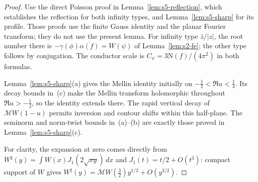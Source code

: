 \documentclass[11pt]{article}
\numberwithin{equation}{section}
\newcommand{\N}{\mathrm N}
\begin{document}
\begin{proof}
Use the direct Poisson proof in Lemma~\ref{lem:s5-reflection}, which establishes
the reflection for both infinity types, and Lemma~\ref{lem:s5-sharp} for its profile.
Those proofs use the finite Gauss identity and the planar Fourier transform;
they do not use the present lemma. For infinity type $\bar z/|z|$, the root number
there is $-\gamma(\phi)\overline{\alpha(f)}=W(\psi)$ of Lemma~\ref{lem:s2-fe};
the other type follows by conjugation. The conductor scale is
$C_\psi=3\N(f)/(4\pi^2)$ in both formulas.

Lemma~\ref{lem:s5-sharp}(a) gives the Mellin identity initially on
$-\frac12<\Re u<\frac14$. Its decay bounds in~(c) make the Mellin transform
holomorphic throughout $\Re u>-\frac12$, so the identity extends there.
The rapid vertical decay of $\mathcal MW(1-u)$ permits inversion and contour
shifts within this half-plane. The seminorm and norm-twist bounds in~(a)--(b)
are exactly those proved in Lemma~\ref{lem:s5-sharp}(c).

For clarity, the expansion at zero comes directly from
$W^\sharp(y)=\int W(x)J_1(2\sqrt{xy})\,dx$ and
$J_1(t)=t/2+O(t^3)$: compact support of $W$ gives
$W^\sharp(y)=\mathcal MW(\frac32)y^{1/2}+O(y^{3/2})$.
\end{proof}
\end{document}
